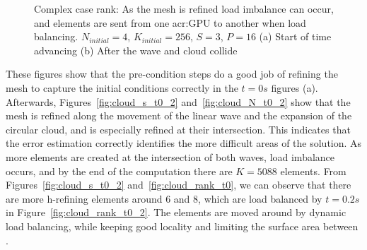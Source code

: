 \begin{figure}[H]
    \centering
    \hfill
    \caption{Complex case rank: As the mesh is refined load imbalance can occur, and elements are
        sent from one \acrshort{acr:GPU} to another when load balancing. \(N_{initial} = 4\),
        \(K_{initial} = 256\), \(S = 3\), \(P = 16\) (a) Start of time advancing (b) After the wave
        and cloud collide}\label{fig:cloud_rank}
\end{figure}

These figures show that the pre-condition steps do a good job of refining the mesh to capture the
initial conditions correctly in the \(t = 0 s\) figures (a). Afterwards,
Figures~\ref{fig:cloud_s_t0_2} and~\ref{fig:cloud_N_t0_2} show that the mesh is refined along the
movement of the linear wave and the expansion of the circular cloud, and is especially refined at
their intersection. This indicates that the error estimation correctly identifies the more difficult
areas of the solution. As more elements are created at the intersection of both waves, load
imbalance occurs, and by the end of the computation there are \(K = 5088\) elements. From
Figures~\ref{fig:cloud_s_t0_2} and~\ref{fig:cloud_rank_t0}, we can observe that there are more
h-refining elements around  \(6\) and \(8\), which are load balanced by \(t =
0.2 s\) in Figure~\ref{fig:cloud_rank_t0_2}. The elements are moved around by dynamic load
balancing, while keeping good locality and limiting the surface area between .

